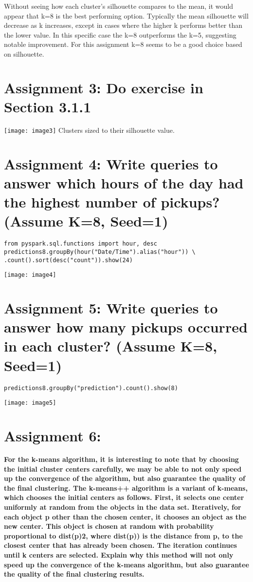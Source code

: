 \documentclass[]{article}
\begin{document}
Without seeing how each cluster's silhouette compares to the mean, it would appear that k=8 is the best performing option. 
Typically the mean silhouette will decrease as k increases, except in cases where the higher k performs better than the lower value. 
In this specific case the k=8 outperforms the k=5, suggesting notable improvement.
For this assignment k=8 seems to be a good choice based on silhouette.

\section*{Assignment 3: Do exercise in Section 3.1.1}

\texttt{[image: image3]}
Clusters sized to their silhouette value.

\clearpage

\section*{Assignment 4: Write queries to answer which hours of the day had the highest number of pickups? (Assume K=8, Seed=1)}

\begin{verbatim}
from pyspark.sql.functions import hour, desc
predictions8.groupBy(hour("Date/Time").alias("hour")) \
.count().sort(desc("count")).show(24)
\end{verbatim}
\texttt{[image: image4]}

\section*{Assignment 5: Write queries to answer how many pickups occurred in each cluster? (Assume K=8, Seed=1)}

\begin{verbatim}
predictions8.groupBy("prediction").count().show(8)
\end{verbatim}
\texttt{[image: image5]}

\section*{Assignment 6:}
\textbf{
For the k-means algorithm, it is interesting to note that by choosing the initial cluster centers 
carefully, we may be able to not only speed up the convergence of the algorithm, but also 
guarantee the quality of the final clustering. The k-means++ algorithm is a variant of k-means, 
which chooses the initial centers as follows. First, it selects one center uniformly at random from 
the objects in the data set. Iteratively, for each object p other than the chosen center, it chooses 
an object as the new center. This object is chosen at random with probability proportional to 
dist(p)2, where dist(p)) is the distance from p, to the closest center that has already been chosen. 
The iteration continues until k centers are selected.
Explain why this method will not only speed up the convergence of the k-means algorithm, but 
also guarantee the quality of the final clustering results.
}
\end{document}
